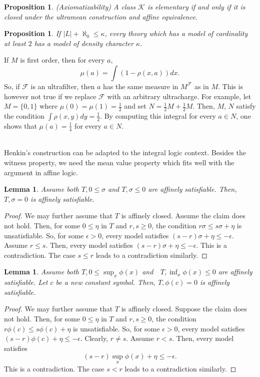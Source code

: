 \documentclass[12pt]{article}
\newtheorem{lemma}[theorem]{Lemma}
\newtheorem{proposition}[theorem]{Proposition}
\begin{document}
\begin{proposition} \emph{(Axiomatizability)}
A class $\mathcal K$ is elementary if and only if it is closed under
the ultramean construction and affine equivalence.
\end{proposition}

\begin{proposition}
If $|L|+\aleph_0\leqslant\kappa$, every theory which has a model of cardinality
at least $2$ has a model of density character $\kappa$.
\end{proposition}

If $M$ is first order, then for every $a$, $$\mu(a)=\int(1-\rho(x,a))dx.$$
So, if $\mathcal F$ is an ultrafilter, then $a$ has the same measure in $M^{\mathcal F}$ as in $M$.
This is however not true if we replace $\mathcal F$ with an arbitrary ultracharge.
For example, let $M=\{0,1\}$ where $\mu(0)=\mu(1)=\frac{1}{2}$ and set $N=\frac{1}{2}M+\frac{1}{2}M$.
Then, $M$, $N$ satisfy the condition $\int\rho(x,y)dy=\frac{1}{2}$.
By computing this integral for every $a\in N$, one shows that $\mu(a)=\frac{1}{4}$ for every $a\in N$.
\vspace{3mm}

\\
Henkin's construction can be adapted to the integral logic context.
Besides the witness property, we need the mean value property which fits well with the argument in affine logic.

\begin{lemma}\label{mean0}
Assume both $T, 0\leqslant\sigma$ and $T,\sigma\leqslant0$ are affinely satisfiable.
Then, $T, \sigma=0$ is affinely satisfiable.
\end{lemma}
\begin{proof}
We may further assume that $T$ is affinely closed. Assume the claim does not hold.
Then, for some $0\leqslant\eta$ in $T$ and $r,s\geqslant0$,
the condition $r\sigma\leqslant s\sigma+\eta$ is unsatisfiable.
So, for some $\epsilon>0$, every model satisfies $(s-r)\sigma+\eta\leqslant-\epsilon$.
Assume $r\leqslant s$. Then, every model satisfies $(s-r)\sigma+\eta\leqslant-\epsilon$.
This is a contradiction. The case $s\leqslant r$ leads to a contradiction similarly.
\end{proof}

\begin{lemma}\label{mean}
Assume both $T,0\leqslant\sup_x\phi(x)$ and\ \ $T,\inf_x\phi(x)\leqslant0$ are affinely satisfiable.
Let $c$ be a new constant symbol. Then, $T,\phi(c)=0$ is affinely satisfiable.
\end{lemma}
\begin{proof}
We may further assume that $T$ is affinely closed. Suppose the claim does not hold.
Then, for some $0\leqslant\eta$ in $T$ and $r,s\geqslant0$,
the condition $r\phi(c)\leqslant s\phi(c)+\eta$ is unsatisfiable.
So, for some $\epsilon>0$, every model satisfies $(s-r)\phi(c)+\eta\leqslant-\epsilon$.
Clearly, $r\neq s$. Assume $r<s$. Then, every model satisfies $$(s-r)\sup_x\phi(x)+\eta\leqslant-\epsilon.$$
This is a contradiction. The case $s<r$ leads to a contradiction similarly.
\end{proof}
\bigskip
\end{document}

